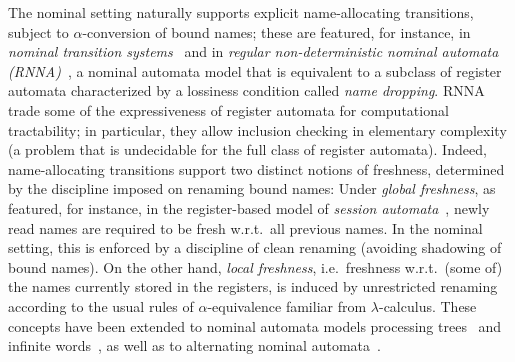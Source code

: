 \documentclass[11pt,a4paper]{amsart}
\theoremstyle{plain}
\numberwithin{equation}{section}
\newcommand{\+}[1]{\mathcal{#1}\xspace}
\theoremstyle{definition}
\begin{document}
The nominal setting naturally supports explicit name-allocating
transitions, subject to $\alpha$-conversion of bound names; these are
featured, for instance, in \emph{nominal transition
  systems}~\cite{ParrowEA21} and in \emph{regular non-deterministic
  nominal automata (RNNA)}~\cite{SchroderEA17}, a nominal automata
model that is equivalent to a subclass of register automata
characterized by a lossiness condition called \emph{name
  dropping}. RNNA trade some of the expressiveness of register
automata for computational tractability; in particular, they allow
inclusion checking in elementary complexity (a problem that is
undecidable for the full class of register automata). Indeed,
name-allocating transitions support two distinct notions of freshness,
determined by the discipline imposed on renaming bound names: Under
\emph{global freshness}, as featured, for instance, in the
register-based model of \emph{session automata}~\cite{BolligEA14},
newly read names are required to be fresh w.r.t.~all previous
names. In the nominal setting, this is enforced by a discipline of
clean renaming (avoiding shadowing of bound names). On the other hand,
\emph{local freshness}, i.e.\ freshness w.r.t.\ (some of) the names
currently stored in the registers, is induced by unrestricted renaming
according to the usual rules of $\alpha$-equivalence familiar from
$\lambda$-calculus. These concepts have been extended to nominal
automata models processing trees~\cite{PruckerSchroder24} and infinite
words~\cite{UrbatEA21}, as well as to alternating nominal
automata~\cite{FrankEA25}.
\end{document}
